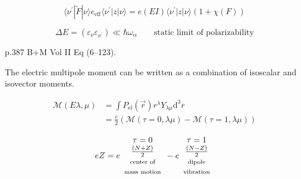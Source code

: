 \documentclass[a4paper,onecolumn,superscriptaddress,12pt,nofootinbib,twoside,raggedfooter,notitlepage]{revtex4-1}
\begin{document}
$$ \langle \nu^\prime | \tilde{F} | \nu \rangle e_\textrm{eff} \langle \nu^\prime | z | \nu \rangle = e(EI) \langle \nu^\prime | z | \nu \rangle \left( 1 + \chi(F) \right) $$

\begin{center}
\end{center}

$$ \Delta E = \left( \varepsilon_\nu \varepsilon_{\nu^\prime} \right) \ll \hbar \omega_\alpha  \qquad \textrm{static limit of polarizability} $$

\begin{center}
\end{center}

\vspace{2cm}

p.387 B+M Vol II Eq (6--123).

The electric multipole moment can be written as a combination of isoscalar and isovector moments.

\begin{align*}
	\mathcal{M}(E\lambda, \mu) &= \int P_\textrm{el} \left( \vec{r} \right) r^\lambda Y_{\lambda \mu} \textrm{d}^3 r \\
	&= \frac{e}{2} \left( \mathcal{M}(\tau=0, \lambda\mu) - \mathcal{M}(\tau=1, \lambda\mu) \right)
\end{align*}

$$ eZ = e \begin{array}{c} \tau=0 \\ \frac{(N+Z)}{2} \\ \textrm{\scriptsize center of} \\ \textrm{\scriptsize mass motion} \end{array} - e \begin{array}{c} \tau=1 \\ \frac{(N-Z)}{2} \\ \textrm{\scriptsize dipole} \\ \textrm{\scriptsize vibration} \end{array} $$
\end{document}
